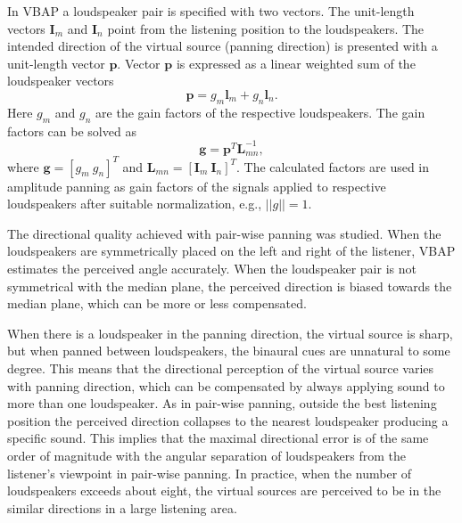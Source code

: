 \documentclass[10pt,a4paper,oneside]{article}
\begin{document}
In VBAP a loudspeaker pair is specified with two vectors. The unit-length vectors $\mathbf{I}_m$ and $\mathbf{I}_n$ point from the listening position to the loudspeakers. The intended direction of the virtual source (panning direction) is presented with a unit-length vector $\mathbf{p}$. Vector $\mathbf{p}$ is expressed as a linear weighted sum of the loudspeaker vectors
\[
\mathbf{p}=g_{m} \mathbf{l}_{m}+g_{n} \mathbf{l}_{n}.
\]
Here $g_m$ and $g_n$ are the gain factors of the respective loudspeakers. The gain factors can be
solved as
\[
\mathbf{g}=\mathbf{p}^{T} \mathbf{L}_{m n}^{-1},
\]
where $\mathbf{g}=\left[ {g_{m}} \ {g_{n}}\right]^{T}$ and  $\mathbf{L}_{mn}=\left[ \mathbf{I}_{m} \  \mathbf{I}_{n}\right]^{T}$. The calculated factors are used in amplitude panning as gain factors of the signals applied to respective loudspeakers after suitable normalization, e.g., $||g|| = 1$.

The directional quality achieved with pair-wise panning was studied. When the loudspeakers are symmetrically placed on the left and right of the listener, VBAP estimates the perceived angle accurately. When the loudspeaker pair is not symmetrical with the median plane, the perceived direction is biased towards the median plane, which can be more or less compensated.

When there is a loudspeaker in the panning direction, the virtual source is sharp, but when panned between loudspeakers, the binaural cues are unnatural to some degree. This means that the directional perception of the virtual source varies with panning direction, which can be compensated by always applying sound to more than one loudspeaker. As in pair-wise panning, outside the best listening position the perceived direction collapses to the nearest loudspeaker producing a specific sound. This implies that the maximal directional error is of the same order of magnitude with the angular separation of loudspeakers from the listener’s viewpoint in pair-wise panning. In practice, when the number of loudspeakers exceeds about eight, the virtual sources are perceived to be in the similar directions in a large listening area.
\end{document}
